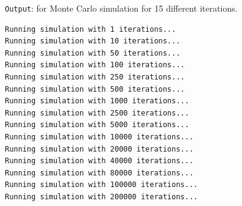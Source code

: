 \documentclass[UTF8, letter]{article}
\begin{document}
\begin{flushleft} \noindent
\texttt{Output}: for Monte Carlo simulation for 15 different iterations.
\end{flushleft}

\begin{outputblock}
\begin{verbatim}
Running simulation with 1 iterations...
Running simulation with 10 iterations...
Running simulation with 50 iterations...
Running simulation with 100 iterations...
Running simulation with 250 iterations...
Running simulation with 500 iterations...
Running simulation with 1000 iterations...
Running simulation with 2500 iterations...
Running simulation with 5000 iterations...
Running simulation with 10000 iterations...
Running simulation with 20000 iterations...
Running simulation with 40000 iterations...
Running simulation with 80000 iterations...
Running simulation with 100000 iterations...
Running simulation with 200000 iterations...
\end{verbatim}
\end{outputblock}
\end{document}
